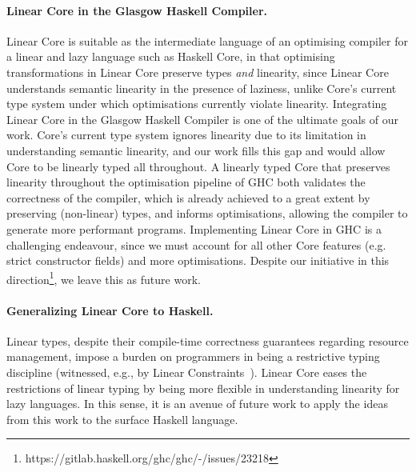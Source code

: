\documentclass[acmsmall,review,anonymous]{acmart}
\begin{document}
\paragraph{Linear Core in the Glasgow Haskell Compiler.}
Linear Core is suitable as the intermediate language of an optimising compiler
for a linear and lazy language such as Haskell Core, in that optimising
transformations in Linear Core preserve types \emph{and} linearity, since Linear
Core understands semantic linearity in the presence of laziness, unlike
Core's current type system under which optimisations currently violate
linearity.
%
Integrating Linear Core in the Glasgow Haskell Compiler is one of the ultimate
goals of our work. Core's current type system ignores linearity due to
its limitation in understanding semantic linearity, and our work fills this gap
and would allow Core to be linearly typed all throughout.
%
A linearly typed Core that preserves linearity throughout the optimisation
pipeline of GHC both validates the correctness of the compiler, which is
already achieved to a great extent by preserving (non-linear) types, and
informs optimisations, allowing the compiler to generate more performant programs.
%
Implementing Linear Core in GHC is a challenging endeavour, since we must account
for all other Core features (e.g. strict constructor fields) and more
optimisations. Despite our initiative in this
direction\footnote{https://gitlab.haskell.org/ghc/ghc/-/issues/23218}, we leave
this as future work.

\paragraph{Generalizing Linear Core to Haskell.}
Linear types, despite their compile-time correctness guarantees regarding
resource management, impose a burden on programmers in being a restrictive
typing discipline (witnessed, e.g., by Linear
Constraints~\cite{cite:linearconstraints}). Linear Core eases the restrictions
of linear typing by being more flexible in understanding linearity for lazy
languages. In this sense, it is an avenue of future
work to apply the ideas from this work to the surface Haskell language.
\end{document}
